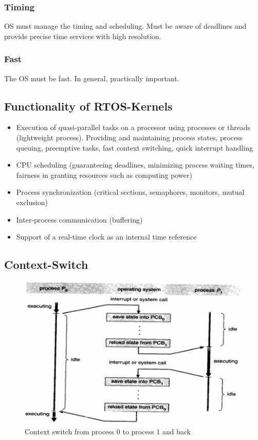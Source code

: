 \subsubsection{Timing}
OS must manage the timing and scheduling. Must be aware of deadlines and provide precise time services with high resolution.

\subsubsection{Fast}
The OS must be fast. In general, practically important.

\subsection{Functionality of RTOS-Kernels}
\begin{itemize}[noitemsep]
\item Execution of quasi-parallel tasks on a processor using processes or threads (lightweight process). Providing and maintaining process states, process queuing, preemptive tasks, fast context switching, quick interrupt handling
\item CPU scheduling (guaranteeing deadlines, minimizing process waiting times, fairness in granting resources such as computing power)
\item Process synchronization (critical sections, semaphores, monitors, mutual exclusion)
\item Inter-process communication (buffering)
\item Support of a real-time clock as an internal time reference
\end{itemize}

\subsection{Context-Switch}
\begin{figure}[ht]
	\centering
  	\includegraphics[scale=0.3]{img/6_context_switch.png}
	\caption{Context switch from process 0 to process 1 and back}
	\label{fig:context_switch}
\end{figure}


